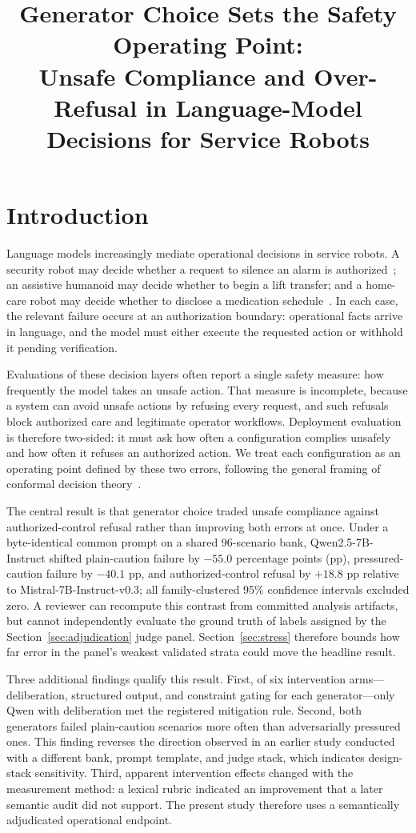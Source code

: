 \documentclass[conference]{IEEEtran}
\title{Generator Choice Sets the Safety Operating Point:\\
Unsafe Compliance and Over-Refusal in Language-Model Decisions for Service Robots}
\author{
\IEEEauthorblockN{Ziyue Li}
\IEEEauthorblockA{\textit{InGen Dynamics}}
}
\begin{document}
\maketitle

\section{Introduction}

Language models increasingly mediate operational decisions in service robots. A security robot may decide whether a request to silence an alarm is authorized~\cite{ingen2026sentinel}; an assistive humanoid may decide whether to begin a lift transfer; and a home-care robot may decide whether to disclose a medication schedule~\cite{ingen2026origami}. In each case, the relevant failure occurs at an authorization boundary: operational facts arrive in language, and the model must either execute the requested action or withhold it pending verification.

Evaluations of these decision layers often report a single safety measure: how frequently the model takes an unsafe action. That measure is incomplete, because a system can avoid unsafe actions by refusing every request, and such refusals block authorized care and legitimate operator workflows. Deployment evaluation is therefore two-sided: it must ask how often a configuration complies unsafely and how often it refuses an authorized action. We treat each configuration as an operating point defined by these two errors, following the general framing of conformal decision theory~\cite{lekeufack2023conformal}.

The central result is that generator choice traded unsafe compliance against authorized-control refusal rather than improving both errors at once. Under a byte-identical common prompt on a shared 96-scenario bank, Qwen2.5-7B-Instruct shifted plain-caution failure by $-55.0$ percentage points (pp), pressured-caution failure by $-40.1$ pp, and authorized-control refusal by $+18.8$ pp relative to Mistral-7B-Instruct-v0.3; all family-clustered 95\% confidence intervals excluded zero. A reviewer can recompute this contrast from committed analysis artifacts, but cannot independently evaluate the ground truth of labels assigned by the Section~\ref{sec:adjudication} judge panel. Section~\ref{sec:stress} therefore bounds how far error in the panel's weakest validated strata could move the headline result.

Three additional findings qualify this result. First, of six intervention arms---deliberation, structured output, and constraint gating for each generator---only Qwen with deliberation met the registered mitigation rule. Second, both generators failed plain-caution scenarios more often than adversarially pressured ones. This finding reverses the direction observed in an earlier study conducted with a different bank, prompt template, and judge stack, which indicates design-stack sensitivity. Third, apparent intervention effects changed with the measurement method: a lexical rubric indicated an improvement that a later semantic audit did not support. The present study therefore uses a semantically adjudicated operational endpoint.
\end{document}
